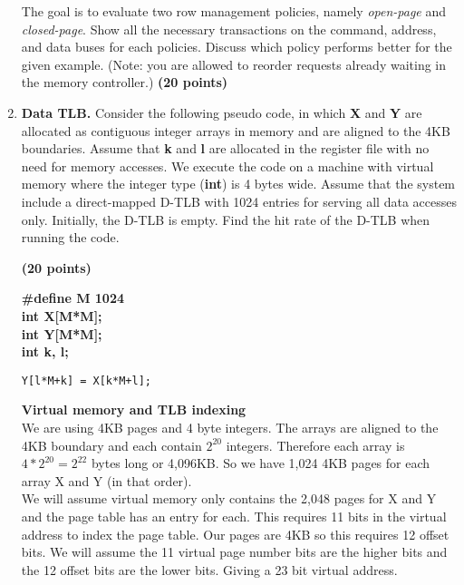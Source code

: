 \documentclass[a4paper, 11pt]{exam}
\begin{document}
\begin{enumerate}
The goal is to evaluate two row management policies, namely \textit{open-page} and \textit{closed-page}.
Show all the necessary transactions on the command, address, and data buses for each policies.
Discuss which policy performs better for the given example.
(Note: you are allowed to reorder requests already waiting in the memory controller.)
\textbf{(20 points)}
\begin{figure}[h!]
	\begin{center}
	\end{center}
\end{figure}


\item \textbf{Data TLB.}
Consider the following  pseudo code, in which \textbf{X} and \textbf{Y} are allocated as contiguous integer arrays in memory and are aligned to the 4KB boundaries.
Assume that \textbf{k} and \textbf{l} are allocated in the register file with no need for memory accesses.
We execute the code on a machine with virtual memory where the integer type (\textbf{int}) is 4 bytes wide.
Assume that the system include a direct-mapped D-TLB with 1024 entries for serving all data accesses only.
Initially, the D-TLB is empty.
Find the hit rate of the D-TLB when running the code.

\textbf{(20 points)}
\begin{algorithm}
	\textbf{\#define M 1024} \\
	\textbf{int X[M*M];} \\
	\textbf{int Y[M*M];} \\
	\textbf{int k, l;}
	\begin{algorithmic}	
		\STATE \texttt{Y[l*M+k] = X[k*M+l];}
		\ENDFOR
		\ENDFOR
	\end{algorithmic}
\end{algorithm}

\textbf{Virtual memory and TLB indexing} \\

We are using 4KB pages and 4 byte integers. The arrays are aligned to the 4KB boundary and each contain $2^{20}$ integers. Therefore each array is $4* 2^{20} = 2^{22}$ bytes long or 4,096KB. So we have 1,024 4KB pages for each array X and Y (in that order). \\

We will assume virtual memory only contains the 2,048 pages for X and Y and the page table has an entry for each. This requires 11 bits in the virtual address to index the page table. Our pages are 4KB so this requires 12 offset bits. We will assume the 11 virtual page number bits are the higher bits and the 12 offset bits are the lower bits. Giving a 23 bit virtual address.


\end{enumerate}
\end{document}
